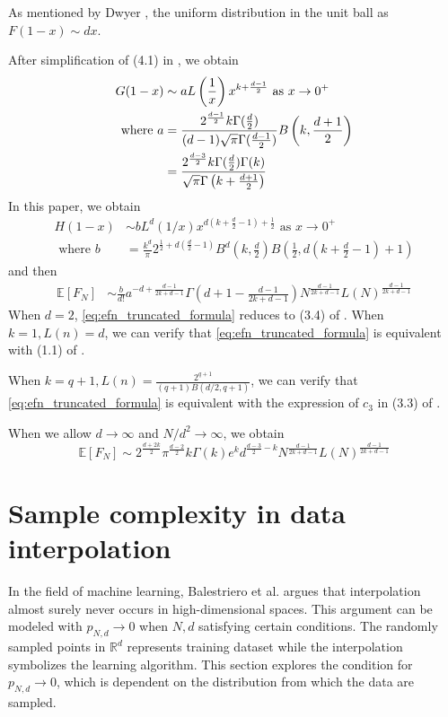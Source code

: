 \documentclass{aptpub}
\def\E{\mathbb{E}}
\def\R{\mathbb{R}}
\begin{document}
As mentioned by Dwyer \cite{dwyer1991convex}, the uniform distribution
in the unit ball as $F(1-x) \sim dx$.

After simplification of (4.1) in \cite{dwyer1991convex}, we obtain
\begin{align}
    G(1-x) &\sim a
    L\left(\frac{1}{x} \right)
    x^{k+\frac{d-1}{2}} \textrm{ as } x \to 0^+ 
    \label{eq:truncated_G_1_x}\\
    \textrm{ where } a &=\frac{2^{\frac{d-1}{2}} k \Gamma(\frac{d}{2})}
    {(d-1) \sqrt{\pi} \Gamma(\frac{d-1}{2})}
    B\left(k, \frac{d+1}{2}\right) \notag \\
    &= \frac{2^{\frac{d-3}{2}} k \Gamma(\frac{d}{2})\Gamma(k)}
    {\sqrt{\pi} \Gamma\left(k+\frac{d+1}{2}\right)}
    \label{eq:a}
\end{align}
In this paper, we obtain
\begin{align}
     H(1-x)  & \sim b
     L^d(1/x) x^{d(k+\frac{d}{2}-1)+\frac{1}{2}} 
     \textrm{ as } x \to 0^+ \label{eq:truncated_H_1_x}\\
     \textrm{ where } b &=  \frac{k^d}{\pi}
     2^{\frac{1}{2} + d(\frac{d}{2}-1)} B^d(k, \frac{d}{2})
     B\left( \frac{1}{2},
     d(k+\frac{d}{2} -1)+1 \right)
     \label{eq:b}
 \end{align}
and then
 \begin{align}\label{eq:efn_truncated_formula}
     \E[F_N] &\sim \frac{b}{d!}a^{-d+\frac{d-1}{2k+d-1}}
     \Gamma 
     \left(d+1-\frac{d-1}{2k+d-1}\right)
     N^{\frac{d-1}{2k+d-1}}
     L(N)
     ^{\frac{d-1}{2k+d-1}}
 \end{align}
 When $d=2$, \eqref{eq:efn_truncated_formula} reduces to (3.4) of \cite{carnal1970konvexe}.
 When $k=1, L(n)=d$, we can verify that
 \eqref{eq:efn_truncated_formula} is equivalent with (1.1)
 of \cite{raynaud1970enveloppe}.
 
 When $k=q+1, L(n)=\frac{2^{q+1}}{(q+1)B(d/2,q+1)}$,
 we can verify that
 \eqref{eq:efn_truncated_formula} is equivalent with the expression of $c_3$
 in (3.3) of \cite{affentranger1991convex}.

 When we allow $d\to \infty$ and $N/d^2 \to \infty$, we obtain
 \begin{equation}\label{eq:truncated_d_inf}
  \E[F_N] \sim 2^{\frac{d+2k}{2}}\pi^{\frac{d-2}{2}} k\Gamma(k)e^k d^{\frac{d-3}{2}-k}
  N^{\frac{d-1}{2k+d-1}} L(N)^{\frac{d-1}{2k+d-1}}
 \end{equation}
\section{Sample complexity in data interpolation}\label{sec:sample_complexity}
In the field of machine learning,
Balestriero et al. \cite{balestriero2021learning}
argues that interpolation almost surely never occurs in high-dimensional spaces.
This argument can be modeled with $p_{N,d} \to 0$ when $N,d$ satisfying certain conditions.
The randomly sampled points in $\R^d$ represents training dataset while the interpolation
symbolizes the learning algorithm. This section explores the condition for $p_{N,d} \to 0$,
which is dependent on the distribution from which the data are sampled.
\end{document}
